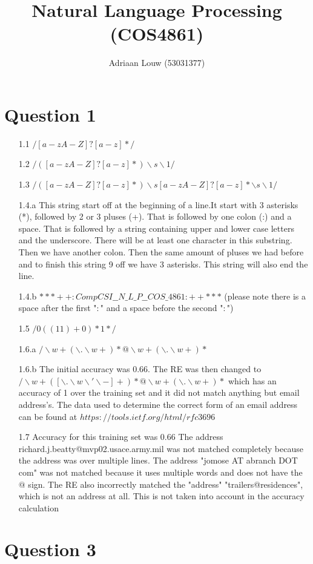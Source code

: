 \documentclass[10pt,a4paper]{article}
\title{Natural Language Processing (COS4861)}
\author{Adriaan Louw (53031377)}
\begin{document}
\maketitle

\section{Question 1}
\begin{enumerate}[leftmargin=\labelsep]
\item[1.1]$/[a-zA-Z]?[a-z]*/$

\item[1.2]$/([a-zA-Z]?[a-z]*)\backslash s \backslash 1/$

\item[1.3]$/([a-zA-Z]?[a-z]*)\backslash s [a-zA-Z]?[a-z]* \backslash s \backslash 1/$

\item[1.4.a]This string start off at the beginning of a line.It start with 3 asterisks (*), followed by 2 or 3 pluses (+). That is followed by one colon (:) and a space. That is followed by a string containing upper and lower case letters and the underscore. There will be at least one character in this substring. Then we have another colon. Then the same amount of pluses we had before and to finish this string 9 off we have 3 asterisks. This string will also end the line.

\item[1.4.b] $***++: CompCSI\_\_N\_L\_P\_\_COS\_4861 :++***$ \newline
 (please note there is a space after the first "$:$" and a space before the second "$:$")

\item[1.5] $/0((11)+0)*1*/$

\item[1.6.a] $/\backslash w+(\backslash . \backslash w +)*@ \backslash w+(\backslash . \backslash w +)*$

\item[1.6.b] The initial accuracy was 0.66. \newline
             The RE was then changed to $/\backslash w+([\backslash . \backslash w\backslash ' \backslash -] +)*@ \backslash w+(\backslash . \backslash w +)*$ which has an accuracy of 1 over the training set and it did not match anything but email address's. The data used to determine the correct form of an email address can be found at $https://tools.ietf.org/html/rfc3696$
 
\item[1.7] Accuracy for this training set was 0.66 \newline
 The address richard.j.beatty@mvp02.usace.army.mil was not matched completely because the address was over multiple lines. \newline
 The address "jomose AT abranch DOT com" was not matched because it uses multiple words and does not have the $@$ sign. \newline
 The RE also incorrectly matched the "address" "trailers@residences", which is not an address at all. This is not taken into account in the accuracy calculation
      

\end{enumerate}


\section{Question 3}
\end{document}
